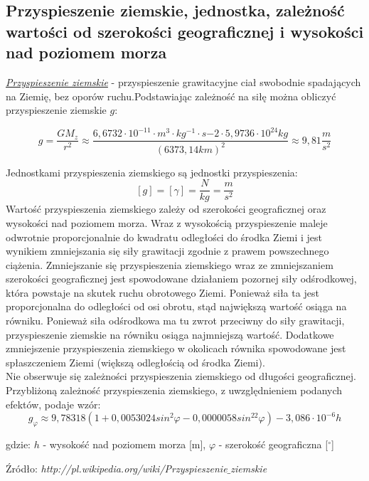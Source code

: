 \documentclass{article}
\begin{document}
\begin{small}
\subsection*{Przyspieszenie ziemskie, jednostka, zależność wartości od szerokości geograficznej i wysokości nad poziomem morza}
\textit{\underline{Przyspieszenie ziemskie}} - przyspieszenie grawitacyjne ciał swobodnie spadających na Ziemię, bez oporów ruchu.Podstawiając zależność na siłę można obliczyć przyspieszenie ziemskie $g$:
\begin{Large}
$$g=\frac{GM_z}{r^2}\approx\frac{6,6732 \cdot 10^{-11} \cdot m^3 \cdot kg^{-1} \cdot s{-2} \cdot 5,9736 \cdot 10^{24}kg}{(6373,14 km)^2} \approx 9,81 \frac{m}{s^2}$$
\end{Large}
Jednostkami przyspieszenia ziemskiego są jednostki przyspieszenia: 
$$[g]=[\gamma]=\frac{N}{kg}=\frac{m}{s^2}$$
Wartość przyspieszenia ziemskiego zależy od szerokości geograficznej oraz wysokości nad poziomem morza. Wraz z wysokością przyspieszenie maleje odwrotnie proporcjonalnie do kwadratu odległości do środka Ziemi i jest wynikiem zmniejszania się siły grawitacji zgodnie z prawem powszechnego ciążenia. Zmniejszanie się przyspieszenia ziemskiego wraz ze zmniejszaniem szerokości geograficznej jest spowodowane działaniem pozornej siły odśrodkowej, która powstaje na skutek ruchu obrotowego Ziemi. Ponieważ siła ta jest proporcjonalna do odległości od osi obrotu, stąd największą wartość osiąga na równiku. Ponieważ siła odśrodkowa ma tu zwrot przeciwny do siły grawitacji, przyspieszenie ziemskie na równiku osiąga najmniejszą wartość. Dodatkowe zmniejszenie przyspieszenia ziemskiego w okolicach równika spowodowane jest spłaszczeniem Ziemi (większą odległością od środka Ziemi).\\
Nie obserwuje się zależności przyspieszenia ziemskiego od długości geograficznej.\\
Przybliżoną zależność przyspieszenia ziemskiego, z uwzględnieniem podanych efektów, podaje wzór:
$$g_{\varphi}\approx 9,78318(1+0,0053024sin^2\varphi-0,0000058sin^22\varphi)-3,086\cdot 10^{-6}h$$
\begin{small}
gdzie: $h$ - wysokość nad poziomem morza [m], $\varphi$ - szerokość geograficzna [$^{\circ}$]
\end{small}
\begin{flushright}
\begin{scriptsize}
Źródło: \textit{http://pl.wikipedia.org/wiki/Przyspieszenie$\_$ziemskie}
\end{scriptsize}
\end{flushright}

\end{small}
\end{document}
